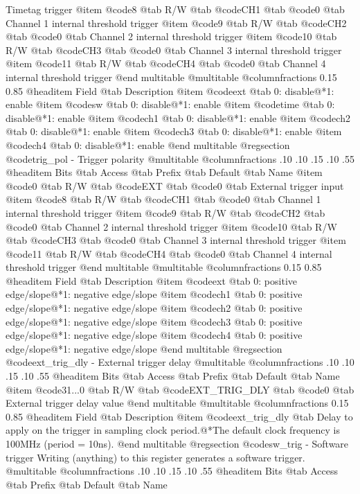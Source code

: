 Timetag trigger
@item @code{8}
@tab R/W @tab
@code{CH1}
@tab @code{0} @tab 
Channel 1 internal threshold trigger
@item @code{9}
@tab R/W @tab
@code{CH2}
@tab @code{0} @tab 
Channel 2 internal threshold trigger
@item @code{10}
@tab R/W @tab
@code{CH3}
@tab @code{0} @tab 
Channel 3 internal threshold trigger
@item @code{11}
@tab R/W @tab
@code{CH4}
@tab @code{0} @tab 
Channel 4 internal threshold trigger
@end multitable
@multitable @columnfractions 0.15 0.85
@headitem Field @tab Description
@item @code{ext} @tab 0: disable@*1: enable
@item @code{sw} @tab 0: disable@*1: enable
@item @code{time} @tab 0: disable@*1: enable
@item @code{ch1} @tab 0: disable@*1: enable
@item @code{ch2} @tab 0: disable@*1: enable
@item @code{ch3} @tab 0: disable@*1: enable
@item @code{ch4} @tab 0: disable@*1: enable
@end multitable
@regsection @code{trig_pol} - Trigger polarity
@multitable @columnfractions .10 .10 .15 .10 .55
@headitem Bits @tab Access @tab Prefix @tab Default @tab Name
@item @code{0}
@tab R/W @tab
@code{EXT}
@tab @code{0} @tab 
External trigger input
@item @code{8}
@tab R/W @tab
@code{CH1}
@tab @code{0} @tab 
Channel 1 internal threshold trigger
@item @code{9}
@tab R/W @tab
@code{CH2}
@tab @code{0} @tab 
Channel 2 internal threshold trigger
@item @code{10}
@tab R/W @tab
@code{CH3}
@tab @code{0} @tab 
Channel 3 internal threshold trigger
@item @code{11}
@tab R/W @tab
@code{CH4}
@tab @code{0} @tab 
Channel 4 internal threshold trigger
@end multitable
@multitable @columnfractions 0.15 0.85
@headitem Field @tab Description
@item @code{ext} @tab 0: positive edge/slope@*1: negative edge/slope
@item @code{ch1} @tab 0: positive edge/slope@*1: negative edge/slope
@item @code{ch2} @tab 0: positive edge/slope@*1: negative edge/slope
@item @code{ch3} @tab 0: positive edge/slope@*1: negative edge/slope
@item @code{ch4} @tab 0: positive edge/slope@*1: negative edge/slope
@end multitable
@regsection @code{ext_trig_dly} - External trigger delay
@multitable @columnfractions .10 .10 .15 .10 .55
@headitem Bits @tab Access @tab Prefix @tab Default @tab Name
@item @code{31...0}
@tab R/W @tab
@code{EXT_TRIG_DLY}
@tab @code{0} @tab 
External trigger delay value
@end multitable
@multitable @columnfractions 0.15 0.85
@headitem Field @tab Description
@item @code{ext_trig_dly} @tab Delay to apply on the trigger in sampling clock period.@*The default clock frequency is 100MHz (period = 10ns).
@end multitable
@regsection @code{sw_trig} - Software trigger
Writing (anything) to this register generates a software trigger.
@multitable @columnfractions .10 .10 .15 .10 .55
@headitem Bits @tab Access @tab Prefix @tab Default @tab Name
